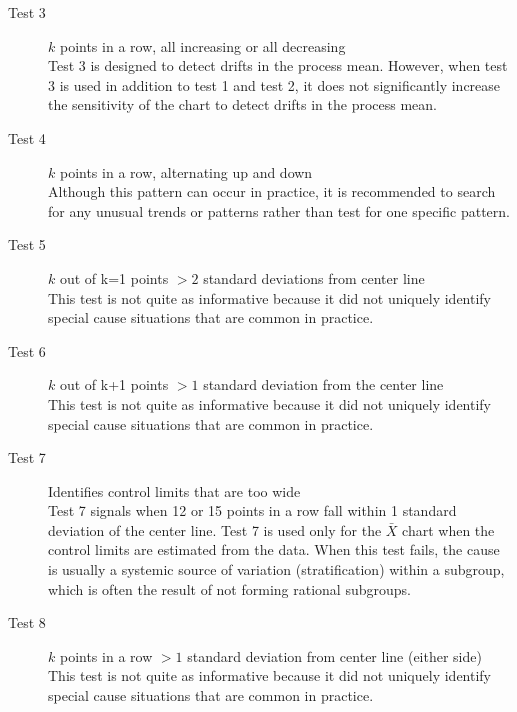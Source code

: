 \documentclass[12pt]{article}
\begin{document}
\begin{description}
\item[Test 3] $k$ points in a row, all increasing or all decreasing\\
Test 3 is designed to detect drifts in the process mean.
However, when test 3 is used in addition to test 1 and test 2, it does not
significantly increase the sensitivity of the chart to detect drifts in the process
mean.


\item[Test 4] $k$ points in a row, alternating up and down\\
Although this pattern can occur in practice, it is recommended to search for any
unusual trends or patterns rather than test for one specific pattern.
\item[Test 5] $k$ out of k=1 points $> 2$ standard deviations from center line\\
This test is not quite as informative because it did not
uniquely identify special cause situations that are common in practice.
\item[Test 6] $k$ out of k+1 points $> 1$ standard deviation from the center line\\
This test is not quite as informative because it did not
uniquely identify special cause situations that are common in practice.

\item[Test 7] Identifies control limits that are too wide\\
Test 7 signals when 12 or 15 points in a row fall within 1 standard deviation of the
center line. Test 7 is used only for the $\bar{X}$ chart when the control limits are
estimated from the data. When this test fails, the cause is usually a systemic source
of variation (stratification) within a subgroup, which is often the result of not 
forming rational subgroups. 
\item[Test 8] $k$ points in a row $> 1$ standard deviation from center line (either
side)\\
This test is not quite as informative because it did not
uniquely identify special cause situations that are common in practice.
\end{description}
\end{document}
